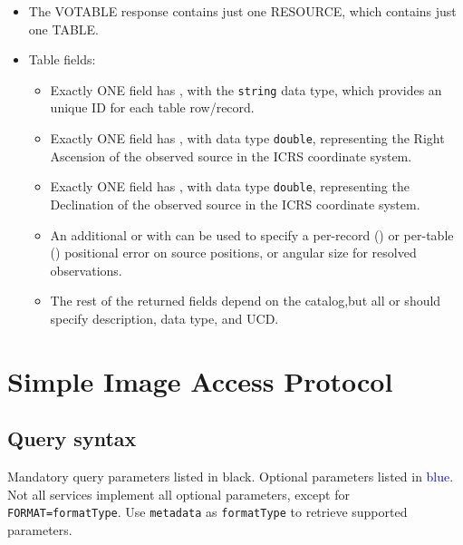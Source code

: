 	\begin{itemize}
		\item The VOTABLE response contains just one RESOURCE, which 
		contains just one TABLE.

		\item Table fields:
		\begin{itemize}
			\item Exactly ONE field has , 
			with the \texttt{string} data type, which provides an 
			unique ID for each table row/record.

			\item Exactly ONE field has 
			,
			with data type \texttt{double}, representing the Right 
			Ascension of the observed source in the ICRS coordinate 
			system.

			\item Exactly ONE field has 
			, with data type 
			\texttt{double}, representing the Declination of the 
			observed source in the ICRS coordinate system.

			\item An additional  or  
			with  can be used to 
			specify a per-record () or per-table 
			() positional error on source positions, 
			or angular size for resolved observations.

			\item The rest of the returned fields depend on the 
			catalog,but all  or  
			should specify description, data type, and UCD.
		\end{itemize}
	\end{itemize}
	
	
	\section{Simple Image Access Protocol} %
	\label{sec:siap}

	\subsection{Query syntax} %
	\label{sub:query_syntax_siap}
	
	Mandatory query parameters listed in black. Optional parameters
	listed in \textcolor{blue}{blue}. Not all services implement all 
	optional parameters, except for \texttt{FORMAT=formatType}. Use 
	\texttt{metadata} as \texttt{formatType} to retrieve supported 
	parameters.
	
